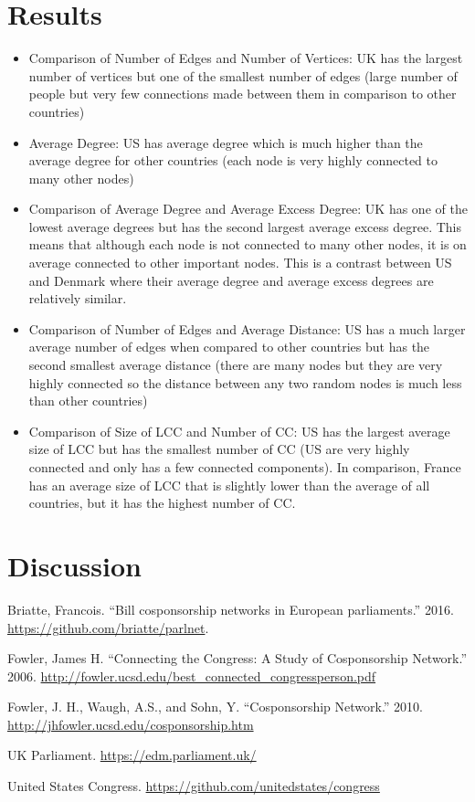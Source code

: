 \documentclass[12pt]{article}
\begin{document}
\section{Results}
\begin{itemize}
  \item Comparison of Number of Edges and Number of Vertices: UK has the largest number of vertices but one of the smallest number of edges (large number of people but very few connections made between them in comparison to other countries)
  \item Average Degree: US has average degree which is much higher than the average degree for other countries (each node is very highly connected to many other nodes)
  \item Comparison of Average Degree and Average Excess Degree: UK has one of the lowest average degrees but has the second largest average excess degree. This means that although each node is not connected to many other nodes, it is on average connected to other important nodes. This is a contrast between US and Denmark where their average degree and average excess degrees are relatively similar.
  \item Comparison of Number of Edges and Average Distance: US has a much larger average number of edges when compared to other countries but has the second smallest average distance (there are many nodes but they are very highly connected so the distance between any two random nodes is much less than other countries)
  \item Comparison of Size of LCC and Number of CC: US has the largest average size of LCC but has the smallest number of CC (US are very highly connected and only has a few connected components). In comparison, France has an average size of LCC that is slightly lower than the average of all countries, but it has the highest number of CC.
\end{itemize}


\section{Discussion}

\newpage
\begin{thebibliography}{9}

 Briatte, Francois. ``Bill cosponsorship networks in European parliaments.'' 2016. \url{https://github.com/briatte/parlnet}.

 Fowler, James H. ``Connecting the Congress: A Study of Cosponsorship Network.'' 2006. \url{http://fowler.ucsd.edu/best_connected_congressperson.pdf}

 Fowler, J. H., Waugh, A.S., and Sohn, Y. ``Cosponsorship Network.'' 2010. \url {http://jhfowler.ucsd.edu/cosponsorship.htm}

 UK Parliament. \url{https://edm.parliament.uk/}

 United States Congress. \url{https://github.com/unitedstates/congress}
\end{thebibliography}
\end{document}
